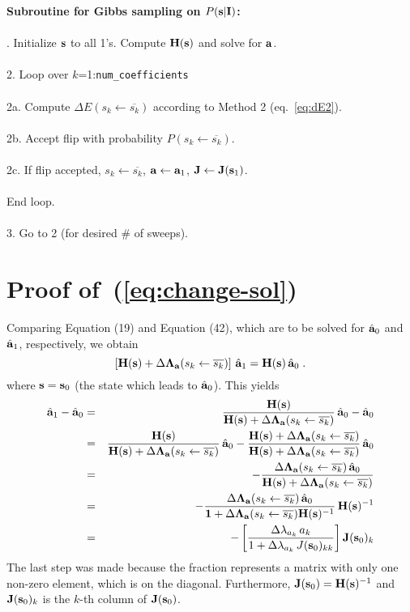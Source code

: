\documentclass[12pt]{article}
\newcommand{\ba}{{\bf a}}
\newcommand{\bah}{\hat{\bf a}}
\newcommand{\bs}{{\bf s}}
\newcommand{\bI}{{\bf I}}
\newcommand{\bLambdaa}{{\bf \Lambda_a}}
\def\lnot{\overline}
\newcommand{\flipsk}{s_k\leftarrow\lnot{s_k}}
\newcommand{\bH}{{\bf H}}
\newcommand{\bJ}{{\bf J}}
\newcommand{\bone}{{\bf 1}}
\begin{document}
\vspace{0.25in}
\noindent
{\bf Subroutine for Gibbs sampling on $P(\bs|\bI)$:}\\
\\
. Initialize $\bs$ to all 1's.  Compute $\bH(\bs)$ and solve for $\ba$. \\
\\
2. Loop over $k$=1:{\tt num\_coefficients}\\
\\
\indent 2a. Compute $\Delta E(\flipsk)$ according to Method 2 
            (eq.~\ref{eq:dE2}). \\
\\
\indent 2b. Accept flip with probability $P(\flipsk)$. \\
\\
\indent 2c. If flip accepted, $\flipsk$, $\ba \leftarrow \ba_1$, 
            $\bJ \leftarrow \bJ(\bs_1)$. \\
\\
\indent End loop.\\
\\
3. Go to 2 (for desired \# of sweeps).




\appendix


\section{Proof of~(\ref{eq:change-sol})}
\label{app:change-sol}

Comparing Equation (19) and Equation (42), which are to be solved for $\bah_0$ and $\bah_1$, respectively, we obtain
\begin{equation}
\left[ \bH(\bs) + \Delta\bLambdaa(\flipsk) \right]\, \bah_1 = \bH(\bs) \, \bah_0 \; .
\end{equation}
where $\bs=\bs_0$ (the state which leads to $\bah_0$). This yields
\begin{eqnarray}
\bah_1 - \bah_0 & = & \frac{\bH(\bs)}{\bH(\bs) + \Delta\bLambdaa(\flipsk)} \, \bah_0 - \bah_0 \\
 & = & \frac{\bH(\bs)}{\bH(\bs) + \Delta\bLambdaa(\flipsk)} \, \bah_0 - \frac{\bH(\bs) + \Delta\bLambdaa(\flipsk)}{\bH(\bs) + \Delta\bLambdaa(\flipsk)} \, \bah_0 \\
 & = & - \frac{\Delta\bLambdaa(\flipsk) \, \bah_0}{\bH(\bs) + \Delta\bLambdaa(\flipsk)} \\
 & = & - \frac{\Delta\bLambdaa(\flipsk) \, \bah_0}{\bone + \Delta\bLambdaa(\flipsk) \bH(\bs)^{-1}} \, \bH(\bs)^{-1} \\
 & = & -\left[\frac{\Delta\lambda_{a_k}\, a_k}
                   {1+\Delta\lambda_{a_k}\, J(\bs_0)_{kk}} \right] \bJ(\bs_0)_k
\end{eqnarray}
The last step was made because the fraction represents a matrix with only one non-zero element, which is on the diagonal.
Furthermore, $\bJ(\bs_0)=\bH(\bs)^{-1}$ and $\bJ(\bs_0)_k$ is the $k$-th column of $\bJ(\bs_0)$.
\end{document}
